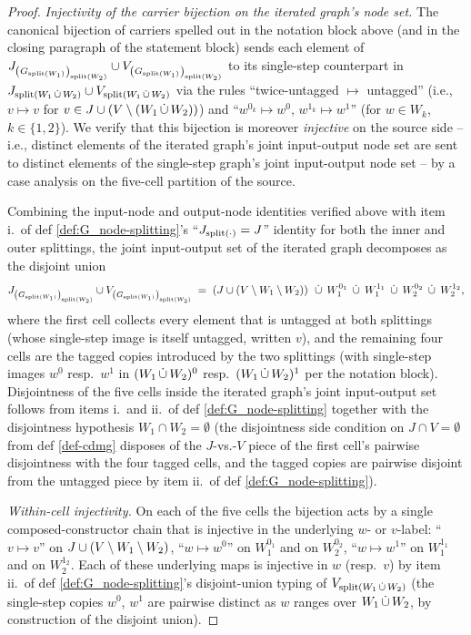 \documentclass[main]{subfiles}
\begin{document}
\begin{proof}
\medskip\noindent\emph{Injectivity of the carrier bijection on the iterated graph's node set.}
The canonical bijection of carriers spelled out in the notation block above (and in the closing paragraph of the statement block) sends each element of $J_{\left ( G_{\mathrm{split}(W_1)} \right )_{\mathrm{split}(W_2)}} \cup V_{\left ( G_{\mathrm{split}(W_1)} \right )_{\mathrm{split}(W_2)}}$ to its single-step counterpart in $J_{\mathrm{split}(W_1 \,\dot{\cup}\, W_2)} \cup V_{\mathrm{split}(W_1 \,\dot{\cup}\, W_2)}$ via the rules ``twice-untagged $\mapsto$ untagged'' (i.e., $v \mapsto v$ for $v \in J \cup (V \setminus (W_1 \,\dot{\cup}\, W_2))$) and ``$w^{0_k} \mapsto w^0$, $w^{1_k} \mapsto w^1$'' (for $w \in W_k$, $k \in \{1, 2\}$). We verify that this bijection is moreover \emph{injective} on the source side -- i.e., distinct elements of the iterated graph's joint input-output node set are sent to distinct elements of the single-step graph's joint input-output node set -- by a case analysis on the five-cell partition of the source.

Combining the input-node and output-node identities verified above with item i.\ of def \ref{def:G_node-splitting}'s ``$J_{\mathrm{split}(\cdot)} = J$'' identity for both the inner and outer splittings, the joint input-output set of the iterated graph decomposes as the disjoint union
\[
    J_{\left ( G_{\mathrm{split}(W_1)} \right )_{\mathrm{split}(W_2)}} \cup V_{\left ( G_{\mathrm{split}(W_1)} \right )_{\mathrm{split}(W_2)}}
    \;=\; \left ( J \cup (V \setminus W_1 \setminus W_2) \right ) \;\,\dot{\cup}\,\; W_1^{0_1} \;\,\dot{\cup}\,\; W_1^{1_1} \;\,\dot{\cup}\,\; W_2^{0_2} \;\,\dot{\cup}\,\; W_2^{1_2},
\]
where the first cell collects every element that is untagged at both splittings (whose single-step image is itself untagged, written $v$), and the remaining four cells are the tagged copies introduced by the two splittings (with single-step images $w^0$ resp.\ $w^1$ in $(W_1 \,\dot{\cup}\, W_2)^0$ resp.\ $(W_1 \,\dot{\cup}\, W_2)^1$ per the notation block). Disjointness of the five cells inside the iterated graph's joint input-output set follows from items i.\ and ii.\ of def \ref{def:G_node-splitting} together with the disjointness hypothesis $W_1 \cap W_2 = \emptyset$ (the disjointness side condition on $J \cap V = \emptyset$ from def \ref{def-cdmg} disposes of the $J$-vs.-$V$ piece of the first cell's pairwise disjointness with the four tagged cells, and the tagged copies are pairwise disjoint from the untagged piece by item ii.\ of def \ref{def:G_node-splitting}).

\emph{Within-cell injectivity.} On each of the five cells the bijection acts by a single composed-constructor chain that is injective in the underlying $w$- or $v$-label: ``$v \mapsto v$'' on $J \cup (V \setminus W_1 \setminus W_2)$, ``$w \mapsto w^0$'' on $W_1^{0_1}$ and on $W_2^{0_2}$, ``$w \mapsto w^1$'' on $W_1^{1_1}$ and on $W_2^{1_2}$. Each of these underlying maps is injective in $w$ (resp.\ $v$) by item ii.\ of def \ref{def:G_node-splitting}'s disjoint-union typing of $V_{\mathrm{split}(W_1 \,\dot{\cup}\, W_2)}$ (the single-step copies $w^0$, $w^1$ are pairwise distinct as $w$ ranges over $W_1 \,\dot{\cup}\, W_2$, by construction of the disjoint union).


\end{proof}
\end{document}
